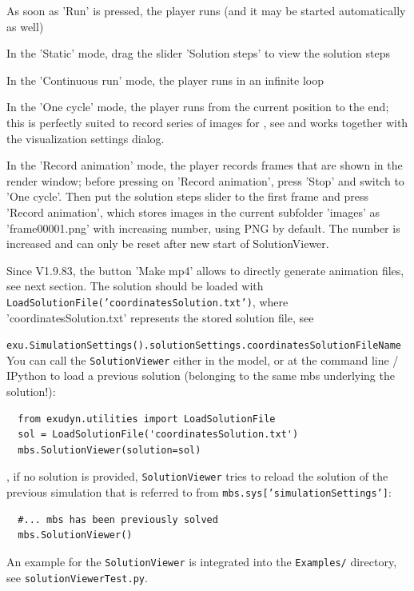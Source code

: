 \item As soon as 'Run' is pressed, the player runs (and it may be started automatically as well)
\item In the 'Static' mode, drag the slider 'Solution steps' to view the solution steps
\item In the 'Continuous run' mode, the player runs in an infinite loop
\item In the 'One cycle' mode, the player runs from the current position to the end; this is perfectly suited to record series of images for , see  and works together with the visualization settings dialog.
\item In the 'Record animation' mode, the player records frames that are shown in the render window; before pressing on 'Record animation', press 'Stop' and switch to 'One cycle'. Then put the solution steps slider to the first frame and press 'Record animation', which stores images in the current subfolder 'images' as 'frame00001.png' with increasing number, using PNG by default. The number is increased and can only be reset after new start of SolutionViewer.
\item Since \codeName V1.9.83, the button 'Make mp4' allows to directly generate animation files, see next section.
\ei
The solution should be loaded with
\texttt{LoadSolutionFile('coordinatesSolution.txt')}, where 'coordinatesSolution.txt' represents the stored solution file, 
see 
\bi
  \item \texttt{exu.SimulationSettings().solutionSettings.coordinatesSolutionFileName}
\ei
You can call the \texttt{SolutionViewer} either in the model, or at the command line / IPython to load a previous solution (belonging to the same mbs underlying the solution!):
\pythonstyle\begin{lstlisting}
  from exudyn.utilities import LoadSolutionFile
  sol = LoadSolutionFile('coordinatesSolution.txt')
  mbs.SolutionViewer(solution=sol)
\end{lstlisting}
%
, if no solution is provided, \texttt{SolutionViewer} tries to reload the solution of the previous simulation that is referred to from \texttt{mbs.sys['simulationSettings']}:
\pythonstyle\begin{lstlisting}
  #... mbs has been previously solved
  mbs.SolutionViewer()
\end{lstlisting}
An example for the \texttt{SolutionViewer} is integrated into the \texttt{Examples/} directory, see \texttt{solutionViewerTest.py}. \\

